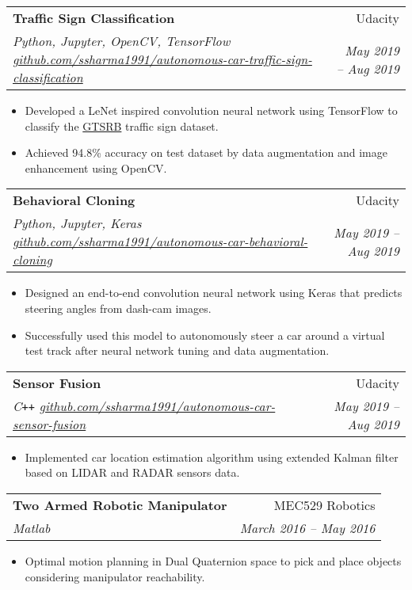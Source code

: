 \documentclass[letterpaper,10pt]{article}
\makeatletter
\newcommand{\resumeHeading}[4]{
  \vspace{-1pt}
    \begin{tabular*}{0.97\textwidth}{l@{\extracolsep{\fill}}r}
      \textbf{#1} & #2 \vspace{-2pt}\\ \vspace{1pt}
      \textit{\small#3} & \textit{\small #4} \\
    \end{tabular*}
}
\newcommand{\resumeItemListStart}{
\vspace{-7pt}
\begin{itemize}[leftmargin=14pt]
}
\newcommand{\resumeItemListEnd}{
\vspace{+7pt}
\end{itemize}
}
\newcommand{\resumeItem}[1]{
  \item\small{
      {#1 \vspace{-7pt}
      }
  }
}
\makeatother
\begin{document}
	\vspace{-2pt}
	\resumeHeading{Traffic Sign Classification}{Udacity}{Python, Jupyter, OpenCV, TensorFlow \href{https://github.com/ssharma1991/autonomous-car-traffic-sign-classification}{github.com/ssharma1991/autonomous-car-traffic-sign-classification}}{May 2019 -- Aug 2019}
	\resumeItemListStart
	\resumeItem{Developed a LeNet inspired convolution neural network using TensorFlow to classify the \href{http://benchmark.ini.rub.de/?section=gtsrb}{GTSRB} traffic sign dataset.}
	\resumeItem{Achieved 94.8\% accuracy on test dataset by data augmentation and image enhancement using OpenCV. }
	\resumeItemListEnd
	
	\vspace{-2pt}
	\resumeHeading{Behavioral Cloning}{Udacity}{Python, Jupyter, Keras \href{https://github.com/ssharma1991/autonomous-car-behavioral-cloning}{github.com/ssharma1991/autonomous-car-behavioral-cloning}}{May 2019 -- Aug 2019}
	\resumeItemListStart
	\resumeItem{Designed an end-to-end convolution neural network using Keras that predicts steering angles from dash-cam images.}
	\resumeItem{Successfully used this model to autonomously steer a car  around a virtual test track after neural network tuning and data augmentation.}
	\resumeItemListEnd
	
	\vspace{-2pt}
	\resumeHeading{Sensor Fusion}{Udacity}{C\texttt{++} \href{https://github.com/ssharma1991/autonomous-car-sensor-fusion}{github.com/ssharma1991/autonomous-car-sensor-fusion}}{May 2019 -- Aug 2019}
	\resumeItemListStart
	\resumeItem{Implemented car location estimation algorithm using extended Kalman filter based on LIDAR and RADAR sensors data.}
	\resumeItemListEnd
	
	
	\vspace{-2pt}
	\resumeHeading{Two Armed Robotic Manipulator}{MEC529 Robotics}{Matlab}{March 2016 -- May 2016}
	\resumeItemListStart
	\resumeItem{Optimal motion planning in Dual Quaternion space to pick and place objects considering manipulator reachability.}
	\resumeItemListEnd
	
\end{document}
